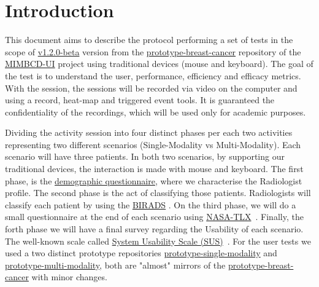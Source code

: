 
\section{Introduction}

This document aims to describe the protocol performing a set of tests in the scope of \hyperlink{https://github.com/MIMBCD-UI/prototype-breast-screening/releases/tag/v1.2.0-beta}{v1.2.0-beta} version from the \hyperlink{https://github.com/MIMBCD-UI/prototype-breast-cancer}{prototype-breast-cancer} repository of the \hyperlink{https://mimbcd-ui.github.io/}{MIMBCD-UI} project using traditional devices (mouse and keyboard). The goal of the test is to understand the user, performance, efficiency and efficacy metrics. With the session, the sessions will be recorded via video on the computer and using a record, heat-map and triggered event tools. It is guaranteed the confidentiality of the recordings, which will be used only for academic purposes.

Dividing the activity session into four distinct phases per each two activities representing two different scenarios (Single-Modality vs Multi-Modality). Each scenario will have three patients. In both two scenarios, by supporting our traditional devices, the interaction is made with mouse and keyboard. The first phase, is the \hyperlink{https://docs.google.com/forms/d/1cGmaCGZjeLJhUl_My2wxJ7gcpm7vQRxYhds6Ys0NoSc/edit?usp=sharing}{demographic questionnaire}, where we characterise the Radiologist profile. The second phase is the act of classifying those patients. Radiologists will classify each patient by using the \hyperlink{https://en.wikipedia.org/wiki/BI-RADS}{BIRADS} \cite{balleyguier2007birads}. On the third phase, we will do a small questionnaire at the end of each scenario using \hyperlink{https://en.wikipedia.org/wiki/NASA-TLX}{NASA-TLX}~\cite{ramkumar2017using}. Finally, the forth phase we will have a final survey regarding the Usability of each scenario. The well-known scale called \hyperlink{https, therefore, support this phase://en.wikipedia.org/wiki/System_usability_scale}{System Usability Scale (SUS)}~\cite{orfanou2015perceived}. For the user tests we used a two distinct prototype repositories \hyperlink{https://github.com/MIMBCD-UI/prototype-single-modality}{prototype-single-modality} and \hyperlink{https://github.com/MIMBCD-UI/prototype-multi-modality}{prototype-multi-modality}, both are "almost" mirrors of the \hyperlink{https://github.com/MIMBCD-UI/prototype-breast-cancer}{prototype-breast-cancer} with minor changes.